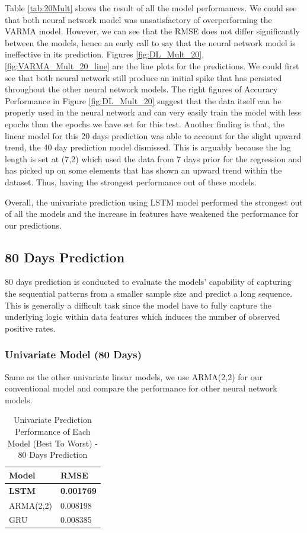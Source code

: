 Table \ref{tab:20Mult} shows the result of all the model performances. We could see that both neural network model was unsatisfactory of overperforming the VARMA model. However, we can see that the RMSE does not differ significantly between the models, hence an early call to say that the neural network model is ineffective in its prediction. Figures \ref{fig:DL_Mult_20}, \ref{fig:VARMA_Mult_20_line} are the line plots for the predictions. We could first see that both neural network still produce an initial spike that has persisted throughout the other neural network models. The right figures of Accuracy Performance in Figure \ref{fig:DL_Mult_20} suggest that the data itself can be properly used in the neural network and can very easily train the model with less epochs than the epochs we have set for this test. Another finding is that, the linear model for this 20 days prediction was able to account for the slight upward trend, the 40 day prediction model dismissed. This is arguably because the lag length is set at (7,2) which used the data from 7 days prior for the regression and has picked up on some elements that has shown an upward trend within the dataset. Thus, having the strongest performance out of these models. 

Overall, the univariate prediction using LSTM model performed the strongest out of all the models and the increase in features have weakened the performance for our predictions. 

\subsection{80 Days Prediction}
80 days prediction is conducted to evaluate the models' capability of capturing the sequential patterns from a smaller sample size and predict a long sequence. This is generally a difficult task since the model have to fully capture the underlying logic within data features which induces the number of observed positive rates. 

\subsubsection{Univariate Model (80 Days)}
Same as the other univariate linear models, we use ARMA(2,2) for our conventional model and compare the performance for other neural network models. 
\begin{table}[h]
\caption{Univariate Prediction Performance of Each Model (Best To Worst) - 80 Days Prediction}
    \label{tab:80Uni}
    \centering
    \begin{tabular}{ |p{3cm}||p{3cm}| }
        \hline
         Model &  RMSE\\
        \hline
        \textbf{LSTM}  & \textbf{0.001769}\\
        ARMA(2,2) & 0.008198\\
        GRU  & 0.008385\\
    \hline
    \end{tabular}
\end{table}

